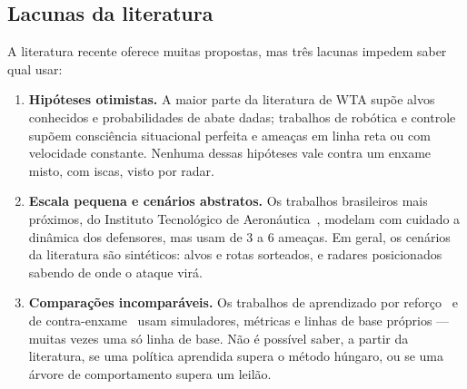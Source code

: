 \subsection{Lacunas da literatura}
A literatura recente oferece muitas propostas, mas três lacunas impedem saber qual usar:
\begin{enumerate}
  \item \textbf{Hipóteses otimistas.} A maior parte da literatura de WTA supõe alvos conhecidos e probabilidades de abate
        dadas; trabalhos de robótica e controle supõem consciência situacional perfeita e ameaças em linha reta ou com
        velocidade constante. Nenhuma dessas hipóteses vale contra um enxame misto, com iscas, visto por radar.
  \item \textbf{Escala pequena e cenários abstratos.} Os trabalhos brasileiros mais próximos, do Instituto Tecnológico
        de Aeronáutica~\cite{ricardo2023,feitosa2025,afonso2020,cruz2025}, modelam com cuidado a dinâmica dos defensores,
        mas usam de 3 a 6 ameaças. Em geral, os cenários da literatura são sintéticos: alvos e rotas sorteados, e radares
        posicionados sabendo de onde o ataque virá.
  \item \textbf{Comparações incomparáveis.} Os trabalhos de aprendizado por reforço~\cite{liu2023drones,palmas2025,jia2026}
        e de contra-enxame~\cite{strickland2018} usam simuladores, métricas e linhas de base próprios --- muitas vezes uma
        só linha de base. Não é possível saber, a partir da literatura, se uma política aprendida supera o método húngaro,
        ou se uma árvore de comportamento supera um leilão.
\end{enumerate}

